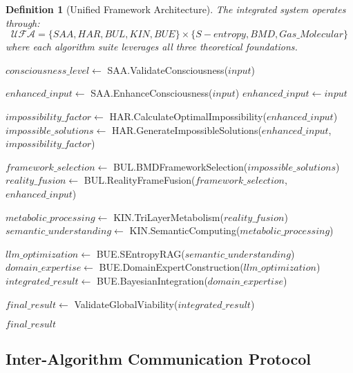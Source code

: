 \documentclass[12pt,a4paper]{article}
\newtheorem{definition}[theorem]{Definition}
\begin{document}
\begin{algorithm}
\begin{algorithmic}[1]
\begin{definition}[Unified Framework Architecture]
The integrated system operates through:
\begin{equation}
\mathcal{UFA} = \{SAA, HAR, BUL, KIN, BUE\} \times \{S-entropy, BMD, Gas\_Molecular\}
\end{equation}
where each algorithm suite leverages all three theoretical foundations.
\end{definition}

\begin{algorithm}
\caption{Unified Framework Processing Pipeline}
\begin{algorithmic}[1]
    \STATE $consciousness\_level \leftarrow$ SAA.ValidateConsciousness($input$)
    
        \STATE $enhanced\_input \leftarrow$ SAA.EnhanceConsciousness($input$)
    \ELSE
        \STATE $enhanced\_input \leftarrow input$
    \ENDIF
    
    \STATE $impossibility\_factor \leftarrow$ HAR.CalculateOptimalImpossibility($enhanced\_input$)
    \STATE $impossible\_solutions \leftarrow$ HAR.GenerateImpossibleSolutions($enhanced\_input$, $impossibility\_factor$)
    
    \STATE $framework\_selection \leftarrow$ BUL.BMDFrameworkSelection($impossible\_solutions$)
    \STATE $reality\_fusion \leftarrow$ BUL.RealityFrameFusion($framework\_selection$, $enhanced\_input$)
    
    \STATE $metabolic\_processing \leftarrow$ KIN.TriLayerMetabolism($reality\_fusion$)
    \STATE $semantic\_understanding \leftarrow$ KIN.SemanticComputing($metabolic\_processing$)
    
    \STATE $llm\_optimization \leftarrow$ BUE.SEntropyRAG($semantic\_understanding$)
    \STATE $domain\_expertise \leftarrow$ BUE.DomainExpertConstruction($llm\_optimization$)
    \STATE $integrated\_result \leftarrow$ BUE.BayesianIntegration($domain\_expertise$)
    
    \STATE $final\_result \leftarrow$ ValidateGlobalViability($integrated\_result$)
    
    \RETURN $final\_result$
\ENDPROCEDURE
\end{algorithmic}
\end{algorithm}

\subsection{Inter-Algorithm Communication Protocol}


\end{algorithmic}
\end{algorithm}
\end{document}
